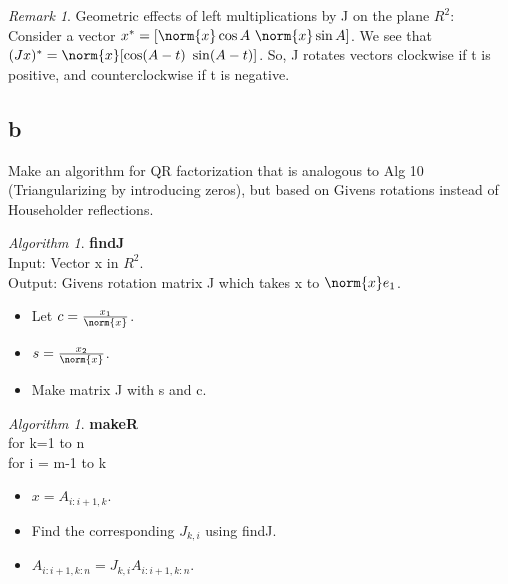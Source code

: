 \documentclass[10pt]{amsart}
\theoremstyle{remark}
\newtheorem{alg}[thm]{Algorithm}
\newtheorem{rem}[thm]{Remark}
\begin{document}
\begin{rem}
 Geometric effects of left multiplications by J on the plane $R^{2}$: Consider a vector $x^{*} = [\norm{x}\cos A \   \norm{x}\sin A]$. We see that $(Jx)^{*} = \norm{x}[\cos(A-t)\ \sin (A-t)]$. So, J rotates vectors clockwise if t is positive, and counterclockwise if t is negative.
\end{rem}

\subsection{b}
Make an algorithm for QR factorization that is analogous to Alg 10 (Triangularizing by introducing zeros), but based on Givens rotations instead of Householder reflections.

\begin{alg}\textbf{findJ}\\
Input: Vector x in $R^{2}$.\\
Output: Givens rotation matrix J which takes x to $\norm{x}e_{1}$.\\
\begin{itemize}
\item Let $c = \frac{x_{1}}{\norm{x}}$.
\item $s=\frac{x_{2}}{\norm{x}}$.
\item Make matrix J with s and c.
\end{itemize}
\end{alg}

\begin{alg} \textbf{makeR}\\
for k=1 to n\\
for i = m-1 to k\\
\begin{itemize}
\item $x = A_{i:i+1,k}$.
\item Find the corresponding $J_{k,i}$ using findJ.
\item $A_{i:i+1,k:n} = J_{k,i} A_{i:i+1,k:n}$.
\end{itemize}
\end{alg}
\end{document}
